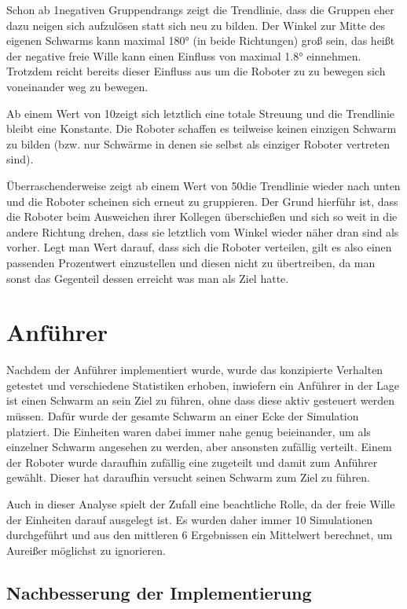 Schon ab 1\per negativen Gruppendrangs zeigt die Trendlinie, dass die Gruppen eher dazu neigen sich aufzulösen statt sich neu zu bilden. Der Winkel zur Mitte des eigenen Schwarms kann maximal 180° (in beide Richtungen) groß sein, das heißt der negative freie Wille kann einen Einfluss von maximal 1.8° einnehmen. Trotzdem reicht bereits dieser Einfluss aus um die Roboter zu zu bewegen sich voneinander weg zu bewegen.

Ab einem Wert von 10\per zeigt sich letztlich eine totale Streuung und die Trendlinie bleibt eine Konstante. Die Roboter schaffen es teilweise keinen einzigen Schwarm zu bilden (bzw. nur Schwärme in denen sie selbst als einziger Roboter vertreten sind).

Überraschenderweise zeigt ab einem Wert von 50\per die Trendlinie wieder nach unten und die Roboter scheinen sich erneut zu gruppieren. Der Grund hierführ ist, dass die Roboter beim Ausweichen ihrer Kollegen überschießen und sich so weit in die andere Richtung drehen, dass sie letztlich vom Winkel wieder näher dran sind als vorher. Legt man Wert darauf, dass sich die Roboter verteilen, gilt es also einen passenden Prozentwert einzustellen und diesen nicht zu übertreiben, da man sonst das Gegenteil dessen erreicht was man als Ziel hatte.


\section{Anführer}

Nachdem der Anführer implementiert wurde, wurde das konzipierte Verhalten getestet und verschiedene Statistiken erhoben, inwiefern ein Anführer in der Lage ist einen Schwarm an sein Ziel zu führen, ohne dass diese aktiv gesteuert werden müssen.
Dafür wurde der gesamte Schwarm an einer Ecke der Simulation platziert. Die Einheiten waren dabei immer nahe genug beieinander, um als einzelner Schwarm angesehen zu werden, aber ansonsten zufällig verteilt. Einem der Roboter wurde daraufhin zufällig eine  zugeteilt und damit zum Anführer gewählt. Dieser hat daraufhin versucht seinen Schwarm zum Ziel zu führen.

Auch in dieser Analyse spielt der Zufall eine beachtliche Rolle, da der freie Wille der Einheiten darauf ausgelegt ist. Es wurden daher immer 10 Simulationen durchgeführt und aus den mittleren 6 Ergebnissen ein Mittelwert berechnet, um Aureißer möglichst zu ignorieren.

\subsection*{Nachbesserung der Implementierung}\label{subsec:AnalyseNachbesserung}

